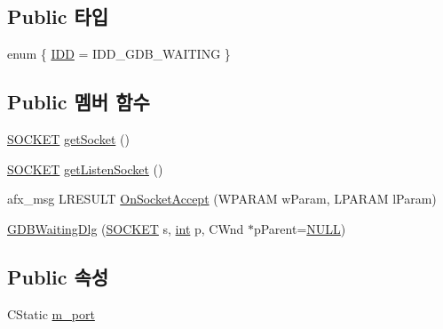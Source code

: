 \subsection*{Public 타입}
\begin{DoxyCompactItemize}
\item 
enum \{ \mbox{\hyperlink{class_g_d_b_waiting_dlg_aa533de8ec8419795c0d1572d637c9101a46edec94a924f41c80746b5923deab43}{I\+DD}} = I\+D\+D\+\_\+\+G\+D\+B\+\_\+\+W\+A\+I\+T\+I\+NG
 \}
\end{DoxyCompactItemize}
\subsection*{Public 멤버 함수}
\begin{DoxyCompactItemize}
\item 
\mbox{\hyperlink{remote_8cpp_aff55fe551a9992a54ec54621c524d0a4}{S\+O\+C\+K\+ET}} \mbox{\hyperlink{class_g_d_b_waiting_dlg_a21c7ce6a732f447fbdb277f0c6b596d3}{get\+Socket}} ()
\item 
\mbox{\hyperlink{remote_8cpp_aff55fe551a9992a54ec54621c524d0a4}{S\+O\+C\+K\+ET}} \mbox{\hyperlink{class_g_d_b_waiting_dlg_ab5fef2284ac8d9ea1b93f05dc4832438}{get\+Listen\+Socket}} ()
\item 
afx\+\_\+msg L\+R\+E\+S\+U\+LT \mbox{\hyperlink{class_g_d_b_waiting_dlg_a086e273c913d5f12449f04a80956d9ee}{On\+Socket\+Accept}} (W\+P\+A\+R\+AM w\+Param, L\+P\+A\+R\+AM l\+Param)
\item 
\mbox{\hyperlink{class_g_d_b_waiting_dlg_ad71a7ff67a8f328efb264ac69af7cd8f}{G\+D\+B\+Waiting\+Dlg}} (\mbox{\hyperlink{remote_8cpp_aff55fe551a9992a54ec54621c524d0a4}{S\+O\+C\+K\+ET}} s, \mbox{\hyperlink{_util_8cpp_a0ef32aa8672df19503a49fab2d0c8071}{int}} p, C\+Wnd $\ast$p\+Parent=\mbox{\hyperlink{_system_8h_a070d2ce7b6bb7e5c05602aa8c308d0c4}{N\+U\+LL}})
\end{DoxyCompactItemize}
\subsection*{Public 속성}
\begin{DoxyCompactItemize}
\item 
C\+Static \mbox{\hyperlink{class_g_d_b_waiting_dlg_a3acb8dcd210dc9bb20df25b0ebb6dc4e}{m\+\_\+port}}
\end{DoxyCompactItemize}
